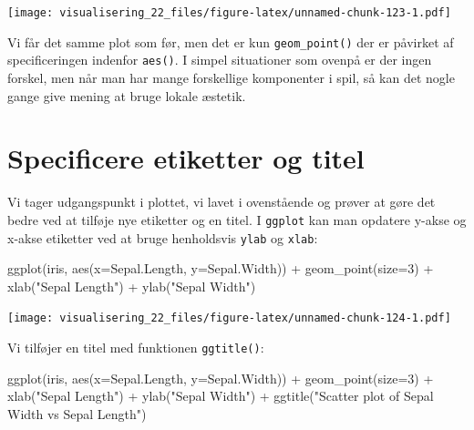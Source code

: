 \documentclass[
]{book}
\newenvironment{Shaded}{\begin{snugshade}}{\end{snugshade}}
\newcommand{\AttributeTok}[1]{\textcolor[rgb]{0.77,0.63,0.00}{#1}}
\newcommand{\DecValTok}[1]{\textcolor[rgb]{0.00,0.00,0.81}{#1}}
\newcommand{\FunctionTok}[1]{\textcolor[rgb]{0.00,0.00,0.00}{#1}}
\newcommand{\NormalTok}[1]{#1}
\newcommand{\SpecialCharTok}[1]{\textcolor[rgb]{0.00,0.00,0.00}{#1}}
\newcommand{\StringTok}[1]{\textcolor[rgb]{0.31,0.60,0.02}{#1}}
\begin{document}
\texttt{[image: visualisering\_22\_files/figure-latex/unnamed-chunk-123-1.pdf]}

Vi får det samme plot som før, men det er kun \texttt{geom\_point()} der er påvirket af specificeringen indenfor \texttt{aes()}. I simpel situationer som ovenpå er der ingen forskel, men når man har mange forskellige komponenter i spil, så kan det nogle gange give mening at bruge lokale æstetik.

\hypertarget{specificere-etiketter-og-titel}{%
\section{Specificere etiketter og titel}\label{specificere-etiketter-og-titel}}

Vi tager udgangspunkt i plottet, vi lavet i ovenstående og prøver at gøre det bedre ved at tilføje nye etiketter og en titel. I \texttt{ggplot} kan man opdatere y-akse og x-akse etiketter ved at bruge henholdsvis \texttt{ylab} og \texttt{xlab}:

\begin{Shaded}
\begin{Highlighting}[]
\FunctionTok{ggplot}\NormalTok{(iris, }\FunctionTok{aes}\NormalTok{(}\AttributeTok{x=}\NormalTok{Sepal.Length, }\AttributeTok{y=}\NormalTok{Sepal.Width)) }\SpecialCharTok{+}
  \FunctionTok{geom\_point}\NormalTok{(}\AttributeTok{size=}\DecValTok{3}\NormalTok{) }\SpecialCharTok{+}
  \FunctionTok{xlab}\NormalTok{(}\StringTok{"Sepal Length"}\NormalTok{) }\SpecialCharTok{+}
  \FunctionTok{ylab}\NormalTok{(}\StringTok{"Sepal Width"}\NormalTok{)}
\end{Highlighting}
\end{Shaded}

\texttt{[image: visualisering\_22\_files/figure-latex/unnamed-chunk-124-1.pdf]}

Vi tilføjer en titel med funktionen \texttt{ggtitle()}:

\begin{Shaded}
\begin{Highlighting}[]
\FunctionTok{ggplot}\NormalTok{(iris, }\FunctionTok{aes}\NormalTok{(}\AttributeTok{x=}\NormalTok{Sepal.Length, }\AttributeTok{y=}\NormalTok{Sepal.Width)) }\SpecialCharTok{+}
  \FunctionTok{geom\_point}\NormalTok{(}\AttributeTok{size=}\DecValTok{3}\NormalTok{) }\SpecialCharTok{+}
  \FunctionTok{xlab}\NormalTok{(}\StringTok{"Sepal Length"}\NormalTok{) }\SpecialCharTok{+}
  \FunctionTok{ylab}\NormalTok{(}\StringTok{"Sepal Width"}\NormalTok{) }\SpecialCharTok{+}
  \FunctionTok{ggtitle}\NormalTok{(}\StringTok{"Scatter plot of Sepal Width vs Sepal Length"}\NormalTok{)}
\end{Highlighting}
\end{Shaded}
\end{document}
